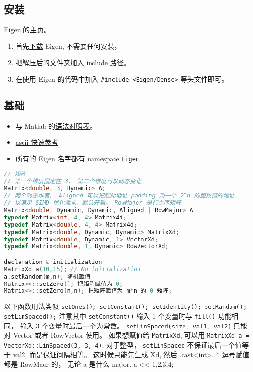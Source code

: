 
\subsection{安装}
Eigen 的\href{http://eigen.tuxfamily.org/index.php?title=Main_Page}{主页}。
\begin{enumerate}
\item 首先\href{http://eigen.tuxfamily.org/index.php?title=Main_Page#Documentation}{下载} Eigen, 不需要任何安装。
\item 把解压后的文件夹加入 include 路径。
\item 在使用 Eigen 的代码中加入 \verb|#include <Eigen/Dense>| 等头文件即可。
\end{enumerate}

\subsection{基础}
\begin{itemize}
\item 与 Matlab 的\href{https://eigen.tuxfamily.org/dox/AsciiQuickReference.txt}{语法对照表}。
\item \href{https://eigen.tuxfamily.org/dox/AsciiQuickReference.txt}{ascii 快速参考}
\item 所有的 Eigen 名字都有 namespace \verb|Eigen|
\end{itemize}

\begin{lstlisting}[language=cpp]
// 矩阵
// 第一个维度固定在 3， 第二个维度可以动态变化
Matrix<double, 3, Dynamic> A;
// 两个动态维度， Aligned 可以把起始地址 padding 到一个 2^n 的整数倍的地址
// 以满足 SIMD 优化需求，默认开启。 RowMajor 是行主序矩阵
Matrix<double, Dynamic, Dynamic, Aligned | RowMajor> A 
typedef Matrix<int, 4, 4> Matrix4i;
typedef Matrix<double, 4, 4> Matrix4d;
typedef Matrix<double, Dynamic, Dynamic> MatrixXd;
typedef Matrix<double, Dynamic, 1> VectorXd;
typedef Matrix<double, 1, Dynamic> RowVectorXd;

declaration & initialization
MatrixXd a(10,15); // No initialization
a.setRandom(m,n); 随机赋值
Matrix<>::setZero(); 把矩阵赋值为 0;
Matrix<>::setZero(m,n); 把矩阵赋值为 m*n 的 0 矩阵;
\end{lstlisting}

以下函数用法类似
\verb|setOnes(); setConstant(); setIdentity(); setRandom(); setLinSpaced();|
注意其中 \verb|setConstant()| 输入 1 个变量时与 \verb|fill()| 功能相同， 输入 3 个变量时最后一个为常数。 \verb|setLinSpaced(size, val1, val2)| 只能对 Vector 或者 RowVector 使用。 如果想赋值给 \verb|MatrixXd|, 可以用 \verb|MatrixXd a = VectorXd::LinSpaced(3, 3, 4)|; 对于整型， \verb|setLinSpaced| 不保证最后一个值等于 val2, 而是保证间隔相等。 这时候只能先生成 Xd, 然后 .cast<int>.
* 逗号赋值都是 RowMaor 的， 无论 a 是什么 major.
a << 1,2,3,4;

